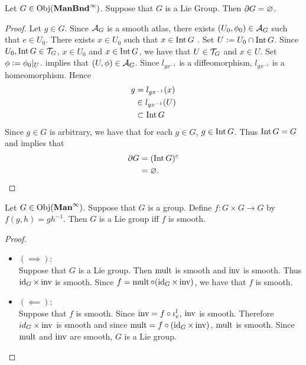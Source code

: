 \documentclass{book}
\begin{document}
\begin{ex}
	Let $G \in \operatorname{Obj}(\operatorname*{\text{\textbf{ManBnd}}^{\infty}})$. Suppose that $G$ is a Lie Group. Then $\partial G = \varnothing$. 
\end{ex}

\begin{proof}
	Let $g \in G$. Since $\mathcal{A}_G$ is a smooth atlas, there exists $(U_0, \phi_0) \in \mathcal{A}_G$ such that $e \in U_0$. There exists $x \in U_0$ such that $x \in \operatorname{Int} G$ . Set $U \vcentcolon= U_0 \cap \operatorname{Int} G$. Since $U_0, \operatorname{Int} G \in \mathcal{T}_G$, $x \in U_0$ and $x \in \operatorname{Int} G$, we have that $U \in \mathcal{T}_G$ and $x \in U$. Set $\phi \vcentcolon= \phi_0|_U$.   implies that $(U, \phi) \in \mathcal{A}_G$. Since $l_{gx^{-1}}$ is a diffeomorphism, $l_{gx^{-1}}$ is a homeomorphism. Hence 
	\begin{align*}
		g
		& = l_{gx^{-1}}(x) \\
		& \in l_{gx^{-1}}(U) \\
		& \subset \operatorname{Int} G
	\end{align*}
	Since $g \in G$ is arbitrary, we have that for each $g \in G$, $g \in \operatorname{Int} G$. Thus $\operatorname{Int} G = G$ and   implies that 
	\begin{align*}
		\partial G 
		& = (\operatorname{Int} G)^c \\
		& = \varnothing.
	\end{align*} 
\end{proof}

\begin{ex}
	Let $G \in \operatorname{Obj}(\operatorname*{\text{\textbf{Man}}^{\infty}})$. Suppose that $G$ is a group. Define $f:G \times G \rightarrow G$ by $f(g, h) = g h^{-1}$. Then $G$ is a Lie group iff $f$ is smooth. 
\end{ex}

\begin{proof}\
	\begin{itemize}
		\item $(\implies)$: \\
		Suppose that $G$ is a Lie group. Then $\operatorname{\text{mult}}$ is smooth and $\operatorname{\text{inv}}$ is smooth. Thus $\operatorname{id}_G \times \operatorname{\text{inv}}$ is smooth. Since $f = \operatorname{\text{mult}} \circ (\operatorname{id}_G \times \operatorname{\text{inv}})$, we have that $f$ is smooth. 
		\item $(\impliedby)$: \\
		Suppose that $f$ is smooth. Since $\operatorname{\text{inv}} = f \circ \iota^l_e$, $\operatorname{\text{inv}}$ is smooth. Therefore $id_G \times \operatorname{\text{inv}}$ is smooth and since $\operatorname{\text{mult}} = f \circ (\operatorname{id}_G \times \operatorname{\text{inv}})$, $\operatorname{\text{mult}}$ is smooth. Since $\operatorname{\text{mult}}$ and $\operatorname{\text{inv}}$ are smooth, $G$ is a Lie group. 
	\end{itemize}
\end{proof}
\end{document}
